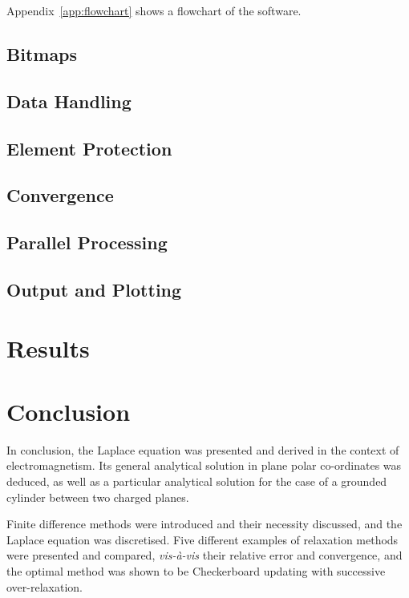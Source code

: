 \documentclass[11pt, a4paper]{article}
\begin{document}
Appendix~\ref{app:flowchart} shows a flowchart of the software.

\subsection{Bitmaps}


\subsection{Data Handling}


\subsection{Element Protection}
\label{sec:mask}


\subsection{Convergence}


\subsection{Parallel Processing}


\subsection{Output and Plotting}


\section{Results}
%

\section{Conclusion}
In conclusion, the Laplace equation was presented and derived in the context of
electromagnetism. Its general analytical solution in plane polar co-ordinates was
deduced, as well as a particular analytical solution for the case of a grounded
cylinder between two charged planes.

Finite difference methods were introduced and their necessity discussed, and the
Laplace equation was discretised. Five different examples of relaxation methods were
presented and compared, \emph{vis-\`{a}-vis} their relative error and convergence, and
the optimal method was shown to be Checkerboard updating with successive over-relaxation.
\end{document}
